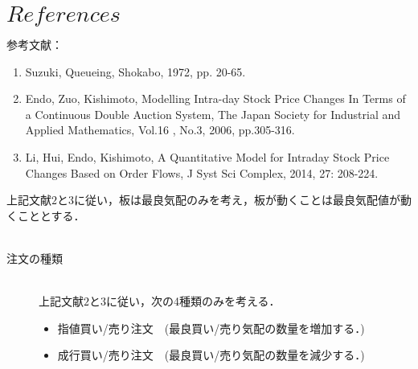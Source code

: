 \documentclass[a4j,papersize,disablejfam,slide,14pt]{jsarticle}
\begin{document}
\section{$References$}
	参考文献：
    \begin{enumerate}
    	\item Suzuki, Queueing, Shokabo, 1972, pp. 20-65.
        \item Endo, Zuo, Kishimoto, 
        Modelling Intra-day Stock Price Changes In Terms of
        a Continuous Double Auction System, 
        The Japan Society for Industrial and Applied Mathematics, 
        Vol.16 , No.3, 2006, pp.305-316.
        \item Li, Hui, Endo, Kishimoto, A Quantitative Model for Intraday Stock Price
         Changes Based on Order Flows, 
         J Syst Sci Complex, 2014, 27: 208-224.
    \end{enumerate}
    上記文献$2$と$3$に従い，板は最良気配のみを考え，板が動くことは最良気配値が動くこととする．\\\\
    \begin{description}
    	\item[注文の種類]\mbox{}\\
     	上記文献$2$と$3$に従い，次の4種類のみを考える．
    	\begin{itemize}
    		\item 指値買い/売り注文　(最良買い/売り気配の数量を増加する．)
        	\item 成行買い/売り注文　(最良買い/売り気配の数量を減少する．)
    	\end{itemize}
     \end{description}
    
\newpage
\end{document}
